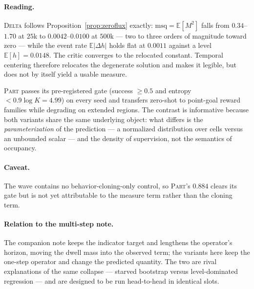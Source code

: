 \documentclass{article}
\providecommand{\E}{\mathbb{E}}
\begin{document}
\paragraph{Reading.} \textsc{Delta} follows Proposition~\ref{prop:zeroflux}
exactly: $\mathrm{msq}=\E[M^2]$ falls from $0.34$--$1.70$ at $25$k to
$0.0042$--$0.0100$ at $500$k --- two to three orders of magnitude toward zero ---
while the event rate $\E|\Delta h|$ holds flat at $0.0011$ against a level
$\E[h]=0.0148$. The critic converges to the relocated constant. Temporal
centering therefore relocates the degenerate solution and makes it legible, but
does not by itself yield a usable measure.

\textsc{Part} passes its pre-registered gate (success $\ge0.5$ and entropy
$<0.9\log K=4.99$) on every seed and transfers zero-shot to point-goal reward
families while degrading on extended regions. The contrast is informative
because both variants share the same underlying object: what differs is the
\emph{parameterization} of the prediction --- a normalized distribution over
cells versus an unbounded scalar --- and the density of supervision, not the
semantics of occupancy.

\paragraph{Caveat.} The wave contains no behavior-cloning-only control, so
\textsc{Part}'s $0.884$ clears its gate but is not yet attributable to the
measure term rather than the cloning term.

\paragraph{Relation to the multi-step note.} The companion note keeps the
indicator target and lengthens the operator's horizon, moving the dwell mass into
the observed term; the variants here keep the one-step operator and change the
predicted quantity. The two are rival explanations of the same collapse ---
starved bootstrap versus level-dominated regression --- and are designed to be
run head-to-head in identical slots.



\end{document}
